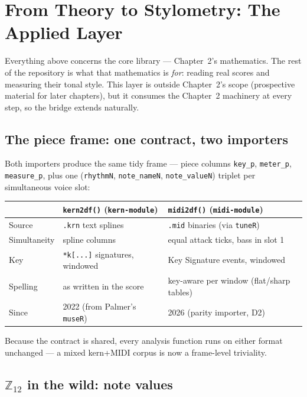 \documentclass[11pt]{article}
\newcommand{\Ztwelve}{\mathbb{Z}_{12}}
\theoremstyle{definition}
\theoremstyle{remark}
\newcommand{\code}[1]{\texttt{#1}}
\newcommand{\file}[1]{\texttt{#1}}
\begin{document}
\section{From Theory to Stylometry: The Applied Layer}\label{sec:applied}

Everything above concerns the core library --- Chapter~2's mathematics. The
rest of the repository is what that mathematics is \emph{for}: reading real
scores and measuring their tonal style. This layer is outside Chapter~2's scope
(prospective material for later chapters), but it consumes the Chapter~2
machinery at every step, so the bridge extends naturally.

\subsection{The piece frame: one contract, two importers}

Both importers produce the same tidy frame --- piece columns
\code{key\_p}, \code{meter\_p}, \code{measure\_p}, plus one
(\code{rhythmN}, \code{note\_nameN}, \code{note\_valueN}) triplet per
simultaneous voice slot:

\begin{center}
\renewcommand{\arraystretch}{1.25}
\begin{tabular}{@{}lll@{}}
\toprule
 & \code{kern2df()} (\file{kern-module}) & \code{midi2df()} (\file{midi-module}) \\
\midrule
Source & \code{.krn} text splines & \code{.mid} binaries (via \code{tuneR}) \\
Simultaneity & spline columns & equal attack ticks, bass in slot 1 \\
Key & \code{*k[...]} signatures, windowed & Key Signature events, windowed \\
Spelling & as written in the score & key-aware per window (flat/sharp tables) \\
Since & 2022 (from Palmer's \code{museR}) & 2026 (parity importer, D2) \\
\bottomrule
\end{tabular}
\end{center}

Because the contract is shared, every analysis function runs on either format
unchanged --- a mixed kern+MIDI corpus is now a frame-level triviality.

\subsection{$\Ztwelve$ in the wild: note values}
\end{document}
